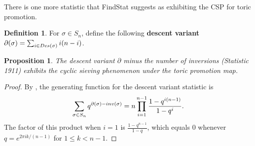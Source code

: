 \documentclass{amsart}
\newtheorem{prop}[thm]{Proposition}
\theoremstyle{definition}
\newtheorem{definition}[thm]{Definition}
\newcommand{\inv}{\textnormal{inv}}
\newcommand{\Des}{\textnormal{Des}}
\begin{document}
There is one more statistic that FindStat suggests as exhibiting the CSP for toric promotion. 
\begin{definition}
For $\sigma\in S_n$, define the following \textbf{descent variant} $\partial(\sigma)=\sum_{i\in \Des(\sigma)}{i(n-i)}$.
\end{definition}

\begin{prop}\label{thm:1911}
The descent variant $\partial$ minus the number of inversions (Statistic 1911) exhibits the cyclic sieving phenomenon under the toric promotion map.
\end{prop}
\begin{proof}
By \cite[Remark 1.5]{StembridgeWaugh}, the generating function for the descent variant statistic is 
\[\sum_{\sigma\in S_n}q^{\partial(\sigma)-\inv(\sigma)}=n\prod_{i=1}^{n-1}\frac{1-q^{i(n-1)}}{1-q^i}.
\]
The factor of this product when $i=1$ is $\displaystyle\frac{1-q^{n-1}}{1-q}$, which equals $0$ whenever $q=e^{2\pi ik/(n-1)}$ for $1\leq k < n-1$. 
\end{proof}






\appendix
\end{document}
